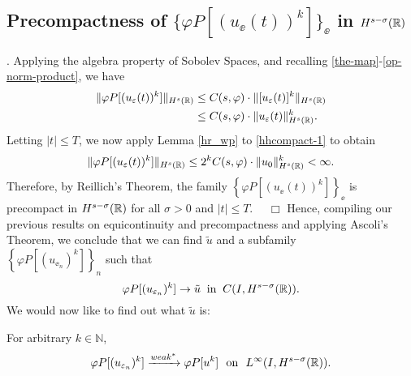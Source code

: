 		\subsection{ Precompactness of $\{\varphi P [(u_\ee(t))^k]\}_\ee$ in
		$H^{s-\sigma  }(\mathbb{R})$}.
		Applying the algebra property of Sobolev
		Spaces, and recalling \eqref{the-map}-\eqref{op-norm-product}, we have
		\begin{equation}
			\begin{split}
			\label{hhcompact-1}
			 \|\varphi P [(u_\varepsilon(t))^k]\|_{H^{s}(\mathbb{R})}
			& \le  C(s, \varphi) \cdot \|[u_\varepsilon(t)]^k\|_{H^{s}(\mathbb{R})}
			\\
			& \le C(s, \varphi) \cdot \|u_\varepsilon(t)\|^k_{H^{s}(\mathbb{R})}.
			\end{split}
		\end{equation}
		Letting $|t| \le T$, we now apply Lemma \ref{hr_wp} to
		\eqref{hhcompact-1} to obtain
		\begin{equation*}
			\begin{split}
			\|\varphi P [(u_\varepsilon(t))^k]\|_{H^{s}(\mathbb{R})}
			\le 2^k C(s, \varphi) \cdot  \|u_0 \|^k_{H^s(\mathbb{R})} < \infty.
			\end{split}
		\end{equation*}
		Therefore, by Reillich's Theorem, the family $\left\{
		\varphi P [(u_\ee(t))^k] \right\}_\ee$ is
		precompact in $H^{s- \sigma }(\mathbb{R})$ for all $\sigma > 0$ and $|t| \le T$. $\quad
		\Box$ 
		Hence, compiling our previous results on equicontinuity and precompactness
		and applying Ascoli's Theorem, we
		conclude that we can find $\tilde{u}$ and a subfamily 
		\\ $\left\{
		\varphi P [(u_{\ee_n})^k]
		\right\}_n$ such that
		\begin{equation}
			\label{hhstrong-conv-of-u_ep}
			\varphi P [(u_{\varepsilon_n})^k] \to \tilde{u}
			\; \; \text{in} \; \; C(I, H^{s-\sigma}(\mathbb{R})).
		\end{equation}
		We would now like to find out what $\tilde{u}$ is:
		\begin{lemma}
			\label{hhlem:crit-conv}
			For arbitrary $k \in \mathbb{N}$,
			\begin{equation}
				\begin{split}
					\varphi P [(u_{\varepsilon_n})^k] \xrightarrow{weak^*}
					\varphi P [u^k] \ \ \text{on} \ \ L^\infty(I,
					H^{s-\sigma}(\mathbb{R})).
					\label{hhcrit-conv-est}
				\end{split}
			\end{equation}
		\end{lemma}

